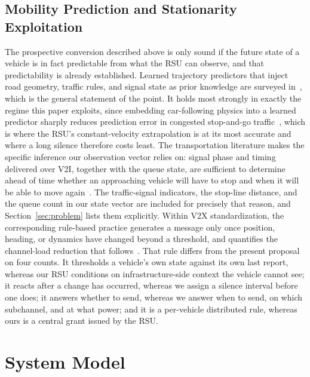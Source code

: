 \documentclass[journal]{IEEEtran}
\begin{document}
\subsection{Mobility Prediction and Stationarity Exploitation}
The prospective conversion described above is only sound if the future state of a vehicle is in fact predictable from what the RSU can observe, and that predictability is already established. Learned trajectory predictors that inject road geometry, traffic rules, and signal state as prior knowledge are surveyed in~\cite{ding2023}, which is the general statement of the point. It holds most strongly in exactly the regime this paper exploits, since embedding car-following physics into a learned predictor sharply reduces prediction error in congested stop-and-go traffic~\cite{yao2023}, which is where the RSU's constant-velocity extrapolation is at its most accurate and where a long silence therefore costs least. The transportation literature makes the specific inference our observation vector relies on: signal phase and timing delivered over V2I, together with the queue state, are sufficient to determine ahead of time whether an approaching vehicle will have to stop and when it will be able to move again~\cite{sun2022}. The traffic-signal indicators, the stop-line distance, and the queue count in our state vector are included for precisely that reason, and Section~\ref{sec:problem} lists them explicitly. Within V2X standardization, the corresponding rule-based practice generates a message only once position, heading, or dynamics have changed beyond a threshold, and quantifies the channel-load reduction that follows~\cite{maksimovski2026}. That rule differs from the present proposal on four counts. It thresholds a vehicle's own state against its own last report, whereas our RSU conditions on infrastructure-side context the vehicle cannot see; it reacts after a change has occurred, whereas we assign a silence interval before one does; it answers whether to send, whereas we answer when to send, on which subchannel, and at what power; and it is a per-vehicle distributed rule, whereas ours is a central grant issued by the RSU.

\section{System Model}
\label{sec:system}
\end{document}
